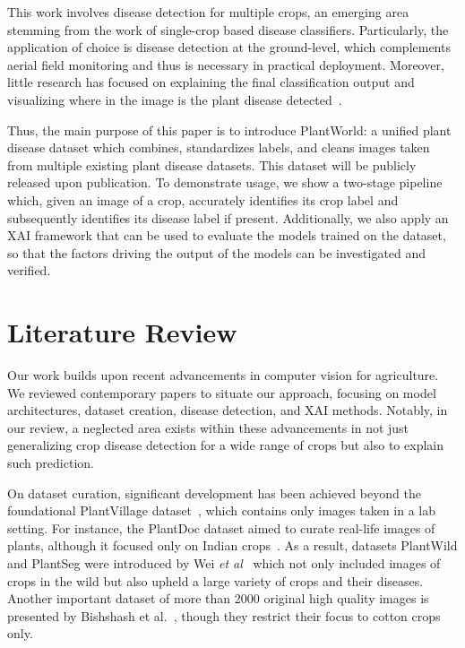 \documentclass{bmvc2k}
\def\etal{\emph{et al}\bmvaOneDot}
\begin{document}
This work involves disease detection for multiple crops, an emerging area stemming from the work of single-crop based disease classifiers. Particularly, the application of choice is disease detection at the ground-level, which complements aerial field monitoring and thus is necessary in practical deployment. Moreover, little research has focused on explaining the final classification output and visualizing where in the image is the plant disease detected~\cite{kaler2025}. 

Thus, the main purpose of this paper is to introduce PlantWorld: a unified plant disease dataset which combines, standardizes labels, and cleans images taken from multiple existing plant disease datasets. This dataset will be publicly released upon publication. To demonstrate usage, we show a two-stage pipeline which, given an image of a crop, accurately identifies its crop label and subsequently identifies its disease label if present. Additionally, we also apply an XAI framework that can be used to evaluate the models trained on the dataset, so that the factors driving the output of the models can be investigated and verified.  

\section{Literature Review}
\label{sec:lit}

Our work builds upon recent advancements in computer vision for agriculture. We reviewed contemporary papers to situate our approach, focusing on model architectures, dataset creation, disease detection, and XAI methods. Notably, in our review, a neglected area exists within these advancements in not just generalizing crop disease detection for a wide range of crops but also to explain such prediction.

On dataset curation, significant development has been achieved beyond the foundational PlantVillage dataset~\cite{mohanty2016}, which contains only images taken in a lab setting. For instance, the PlantDoc dataset aimed to curate real-life images of plants, although it focused only on Indian crops~\cite{singh2020}. As a result, datasets PlantWild and PlantSeg were introduced by Wei \etal~\cite{wei2024a, wei2024b} which not only included images of crops in the wild but also upheld a large variety of crops and their diseases. Another important dataset of more than 2000 original high quality images is presented by Bishshash et al.~\cite{bishshash2024}, though they restrict their focus to cotton crops only.
\end{document}
